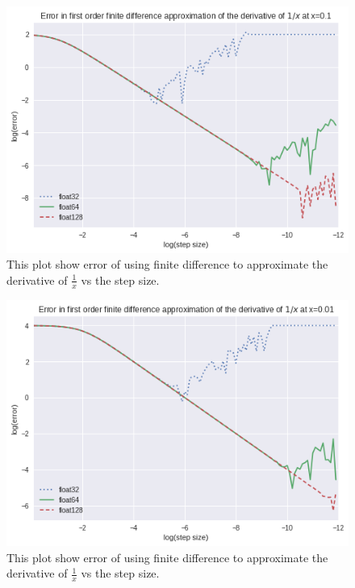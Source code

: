 \begin{figure}[hbt!]
    \centering
    \includegraphics[width=\textwidth]{images/1_x_error_at_p1.png}
    \caption{This plot show error of using finite difference to approximate the derivative of $\frac{1}{x}$ vs the step size.}\label{fig:1/x_0.1}
\end{figure}


\begin{figure}[hbt!]
    \centering
    \includegraphics[width=\textwidth]{images/1_x_error_at_p01.png}
    \caption{This plot show error of using finite difference to approximate the derivative of $\frac{1}{x}$ vs the step size.}\label{fig:1/x_0.01}
\end{figure}